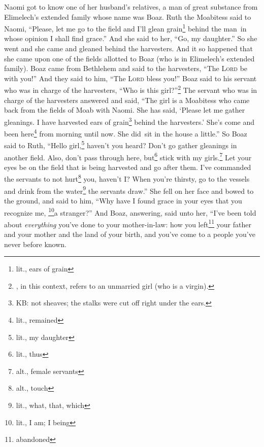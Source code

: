 
\begin{inparaenum}
     Naomi got to know one of her husband's relatives, a man of great substance from Elimelech's extended family whose name was Boaz.%
     Ruth the Moabitess said to Naomi, ``Please, let me go to the field and I'll glean grain\footnote{lit., ears of grain} behind the man\understood\ in whose opinion I shall find grace.'' And she said to her, ``Go, my daughter.''%
     So she went and she came and gleaned behind the harvesters. And it so happened that she came upon one of the fields allotted to Boaz (who is in Elimelech's extended family).%
     Boaz came from Bethlehem and said to the harvesters, ``The \textsc{Lord} be with you!'' And they said to him, ``The \textsc{Lord} bless you!''%
     Boaz said to his servant who was in charge of the harvesters, ``Who is this girl?''\footnote{, in this context, refers to an unmarried girl (who is a virgin).}%
     The servant who was in charge of the harvesters answered and said, ``The girl is a Moabitess who came back from the fields of Moab with Naomi.%
     She has said, `Please let me gather gleanings. I have harvested ears of grain\footnote{KB: not sheaves; the stalks were cut off right under the ears.} behind the harvesters.' She's come and been here\footnote{lit., remained} from morning until now. She did\understood\ sit in the house a little.''%
     So Boaz said to Ruth, ``Hello girl,\footnote{lit., my daughter} haven't you heard? Don't go gather gleanings in another field. Also, don't pass through here, but\footnote{lit., thus} stick with my girls.\footnote{alt., female servants}%
     Let your eyes be on the field that is being harvested and go after them. I've commanded the servants to not hurt\footnote{alt., touch} you, haven't I? When you're thirsty, go to the vessels and drink from the water\understood\footnote{lit., what, that, which} the servants draw.''%
     She fell on her face and bowed to the ground, and said to him, ``Why have I found grace in your eyes that you recognize me, \footnote{lit., I am; I being}a stranger?''%
     And Boaz, answering, said unto her, ``I've been told about \emph{everything} you've done to your mother-in-law: how you left\footnote{abandoned} your father and your mother and the land of your birth, and you've come to a people you've never before known.%

\end{inparaenum}

